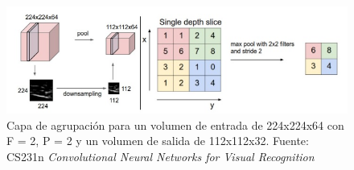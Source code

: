 \begin{figure}[H]
    \centering
    \includegraphics[scale=0.6]{Recursos/maxPolling.jpg}
    \caption[Capa de agrupación para un volumen de entrada de 224x224x64 con F = 2, P = 2 y un volumen de salida de 112x112x32.]{Capa de agrupación para un volumen de entrada de 224x224x64 con F = 2, P = 2 y un volumen de salida de 112x112x32. {\footnotesize Fuente: CS231n\textit{ Convolutional Neural Networks for Visual Recognition} \cite{CS231n}}}
    \label{maxPooling}
\end{figure}
